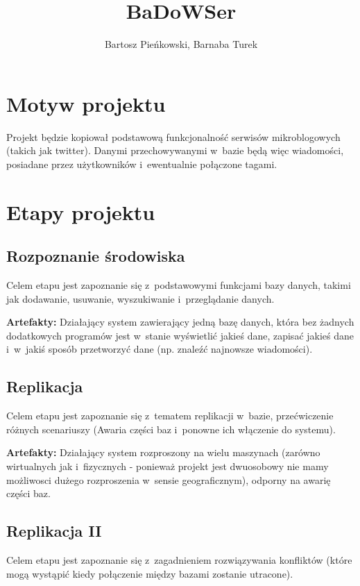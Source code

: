 \documentclass[a4paper]{article}
\begin{document}
\sloppy

\title{BaDoWSer}
\author{Bartosz Pieńkowski, Barnaba Turek}
\maketitle
{}
\section{Motyw projektu}
Projekt będzie kopiował podstawową funkcjonalność serwisów mikroblogowych (takich jak twitter).
Danymi przechowywanymi w~bazie będą więc wiadomości, posiadane przez użytkowników i~ewentualnie połączone tagami.

\section{Etapy projektu}
\subsection{Rozpoznanie środowiska}
Celem etapu jest zapoznanie się z~podstawowymi funkcjami bazy danych, takimi jak dodawanie, usuwanie, wyszukiwanie i~przeglądanie danych.

\textbf{Artefakty:} Działający system zawierający jedną bazę danych, która bez żadnych dodatkowych programów jest w~stanie wyświetlić jakieś dane, zapisać jakieś dane i~w~jakiś sposób przetworzyć dane (np. znaleźć najnowsze wiadomości).

\subsection{Replikacja}
Celem etapu jest zapoznanie się z~tematem replikacji w~bazie, przećwiczenie różnych scenariuszy (Awaria części baz i~ponowne ich włączenie do systemu).

\textbf{Artefakty:} Działający system rozproszony na wielu maszynach (zarówno wirtualnych jak i~fizycznych - ponieważ projekt jest dwuosobowy nie mamy możliwosci dużego rozproszenia w~sensie geograficznym), odporny na awarię części baz.

\subsection{Replikacja II}
Celem etapu jest zapoznanie się z~zagadnieniem rozwiązywania konfliktów (które mogą wystąpić kiedy połączenie między bazami zostanie utracone).
\end{document}
